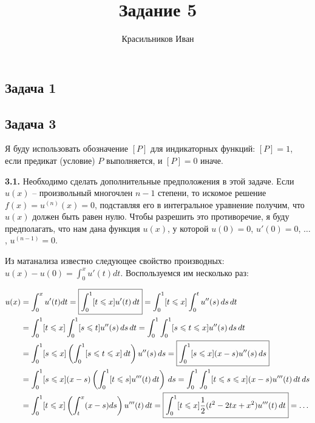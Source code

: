\documentclass[a4paper, 12pt, onepage]{article}
\begin{document}
\author{Красильников Иван}
\title{Задание 5}
\maketitle

\subsection*{Задача 1}


\newpage
\subsection*{Задача 3}

Я буду использовать обозначение $[P]$ для индикаторных функций: $[P] = 1$, если предикат (условие) $P$ выполняется,
и $[P] = 0$ иначе.

\textbf{3.1.} Необходимо сделать дополнительные предположения в этой задаче.
Если $u(x)$ -- произвольный многочлен $n-1$ степени, то искомое решение $f(x) = u^{(n)}(x) = 0$,
подставляя его в интегральное уравнение получим, что $u(x)$ должен быть равен нулю.
Чтобы разрешить это противоречие, я буду предполагать, что нам дана
функция $u(x)$, у которой $u(0) = 0$, $u'(0) = 0$, $\ldots$, $u^{(n-1)} = 0$.

Из матанализа известно следующее свойство производных:
$u(x) - u(0) = \int_0^x u'(t) dt$. Воспользуемся им несколько раз:

\begin{align*}
  u(x) &= \int_0^x u'(t) dt
        = \framebox{$\displaystyle \int_0^1 [t \leqslant x] u'(t) \,dt$}
        = \int_0^1 [t \leqslant x] \int_0^t u''(s) \,ds\, dt \\
       &= \int_0^1 [t \leqslant x] \int_0^1 [s \leqslant t] u''(s) \,ds\, dt
        = \int_0^1 \int_0^1 [s \leqslant t \leqslant x] u''(s) \,ds\, dt \\
       &= \int_0^1 [s \leqslant x] \left(\int_0^1 [s \leqslant t \leqslant x] \,dt\right) u''(s) \,ds
        = \framebox{$\displaystyle \int_0^1 [s \leqslant x] (x - s) u''(s) \,ds$} \\
       &= \int_0^1 [s \leqslant x] (x - s) \left(\int_0^1 [t \leqslant s] u'''(t) \,dt\right)\, ds
        = \int_0^1 \int_0^1 [t \leqslant s \leqslant x] (x - s) u'''(t) \,dt\, ds \\
       &= \int_0^1 [t \leqslant x] \left(\int_t^x (x - s) ds\right) u'''(t) \,dt
        = \framebox{$\displaystyle \int_0^1 [t \leqslant x] \frac12 (t^2 - 2tx + x^2) u'''(t) \,dt$} = \ldots
\end{align*}
\end{document}
